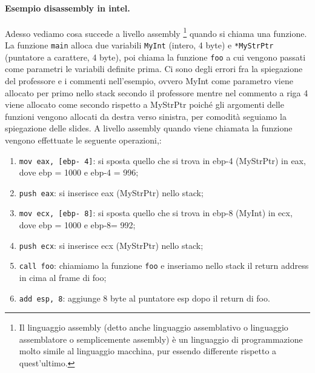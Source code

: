 \paragraph{Esempio disassembly in intel.} Adesso vediamo cosa succede a livello assembly
\footnote{Il linguaggio assembly (detto anche linguaggio assemblativo o linguaggio
    assemblatore o semplicemente assembly) è un linguaggio di programmazione molto simile al
    linguaggio macchina, pur essendo differente rispetto a quest'ultimo.} quando si
chiama una funzione. La funzione \verb|main| alloca due variabili \verb|MyInt|
(intero, 4 byte) e \verb|*MyStrPtr| (puntatore a carattere, 4 byte), poi chiama la
funzione \verb|foo| a cui vengono passati come parametri le variabili definite prima.
Ci sono degli errori fra la spiegazione del professore e i commenti nell'esempio,
ovvero MyInt come parametro viene allocato per primo nello stack secondo il professore
mentre nel commento a riga 4 viene allocato come secondo rispetto a MyStrPtr poiché gli
argomenti delle funzioni vengono allocati da destra verso sinistra, per comodità seguiamo
la spiegazione delle slides.
A livello assembly quando viene chiamata la funzione vengono effettuate le seguente operazioni,:

\begin{enumerate}
    \item  \verb|mov eax, [ebp- 4]|: si sposta quello che si trova in ebp-4 (MyStrPtr)
          in eax, dove ebp = 1000 e ebp-4 = 996;
    \item \verb|push eax|: si inserisce eax (MyStrPtr) nello stack;
    \item  \verb|mov ecx, [ebp- 8]|: si sposta quello che si trova in
          ebp-8 (MyInt) in ecx,  dove ebp = 1000 e ebp-8= 992;
    \item \verb|push ecx|: si inserisce ecx (MyStrPtr) nello stack;
    \item \verb|call foo|: chiamiamo la funzione \verb|foo| e inseriamo nello stack
          il return address in cima al frame di foo;
    \item \verb|add esp, 8|: aggiunge 8 byte al puntatore esp dopo il return di foo.
\end{enumerate}

